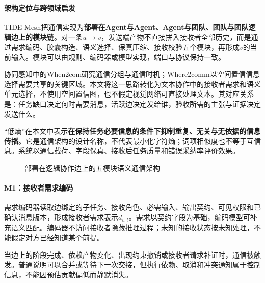 \paragraph{架构定位与跨领域启发}
TIDE-Mesh把通信实现为\textbf{部署在Agent与Agent、Agent与团队、团队与团队逻辑边上的模块链}。对一条$u\rightarrow v$，发送端产物不直接拼入接收者全部历史，而是通过需求编码、胶囊构造、语义选择、保真压缩、接收校验五个模块，再形成$v$的当前输入。模块可以由规则、编码器或模型实现，端口与协议保持一致。

协同感知中的When2com研究通信分组与通信时机\cite{tide_when2com}；Where2comm以空间置信信息选择需要共享的关键区域\cite{tide_where2comm}。本文将这一思路转化为文本协作中的接收者需求和语义单元选择，不使用空间置信图，也不假定视觉网络可直接处理文本。其对应关系是：任务缺口决定何时需要消息，活跃边决定发给谁，验收所需的主张与证据决定发送什么。

“低熵”在本文中表示\textbf{在保持任务必要信息的条件下抑制重复、无关与无依据的信息传播}。它是通信架构的设计名称，不代表最小化字符熵；词项相似度也不等于互信息。系统以通信载荷、字段保真、接收后任务质量和错误采纳率评价效果。

\begin{figure}[htbp]
\centering
{}
\caption{部署在逻辑协作边上的五模块语义通信架构}
\label{fig:mesh_communication}
\end{figure}

\paragraph{M1：接收者需求编码}
需求编码器读取边绑定的子任务、接收角色、必需输入、输出契约、可见权限和已确认消息版本，形成接收者需求表示$d_{v,t}$。需求以契约字段为基础，编码模型可补充语义匹配。编码器不访问接收者隐藏推理过程；未知的接收状态按未知处理，不能假定对方已经知道某个前提。

当边上的阶段完成、依赖产物变化、出现约束撤销或接收者请求补证时，通信被触发。普通说明可以合并或等待下一次交接，但执行依赖、取消和冲突通知属于控制信息，不能因预估贡献偏低而静默消失。

